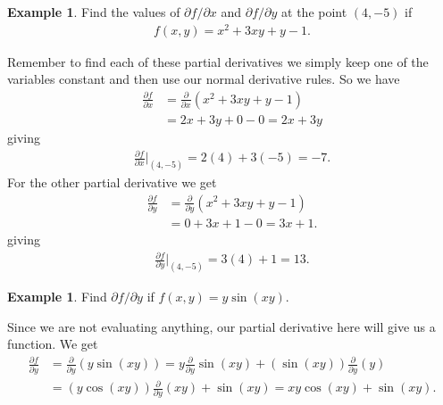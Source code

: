 \documentclass[12pt, letter]{article}
\theoremstyle{plain}
\numberwithin{theorem}{section}
\theoremstyle{definition}
\newtheorem{example}[theorem]{Example}
\begin{document}
\begin{example}
Find the values of $\partial f / \partial x$ and $\partial f / \partial y$ at the point $(4,-5)$ if
\begin{align*}
f(x,y) = x^2+3xy+y-1.
\end{align*}
\smallskip

Remember to find each of these partial derivatives we simply keep one of the variables constant and then use our normal derivative rules. So we have
\begin{align*}
\frac{\partial f}{\partial x} &= \frac{\partial}{\partial x} (x^2+3xy+y-1)\\
&=2x+3y+0-0 = 2x+3y
\end{align*}
giving
\begin{align*}
\frac{\partial f}{\partial x}\bigg\rvert_{(4,-5)} = 2(4)+3(-5) = -7.
\end{align*}
For the other partial derivative we get
\begin{align*}
\frac{\partial f}{\partial y} &= \frac{\partial}{\partial y} (x^2+3xy+y-1)\\
&=0+3x+1-0 = 3x+1.
\end{align*}
giving
\begin{align*}
\frac{\partial f}{\partial y}\bigg\rvert_{(4,-5)} = 3(4)+1 = 13.
\end{align*}
\end{example}

\bigskip

\hrulefill

\bigskip

\begin{example}
Find $\partial f / \partial y$ if $f(x,y) = y\sin(xy)$.

\smallskip

Since we are not evaluating anything, our partial derivative here will give us a function. We get
\begin{align*}
\frac{\partial f}{\partial y} &= \frac{\partial}{\partial y} (y\sin(xy)) = y\frac{\partial}{\partial y} \sin(xy) + (\sin(xy))\frac{\partial}{\partial y} (y)\\
&=(y\cos(xy))\frac{\partial}{\partial y}(xy) + \sin(xy) = xy\cos(xy)+\sin(xy).
\end{align*}
\end{example}

\bigskip

\hrulefill

\bigskip
\end{document}
